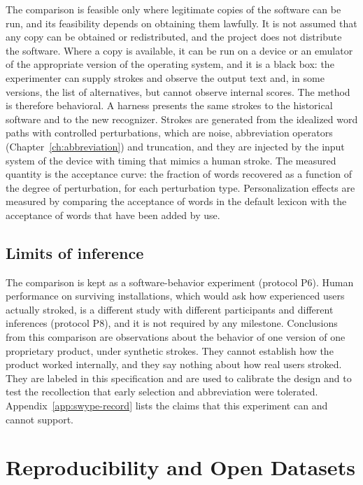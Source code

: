 The comparison is feasible only where legitimate copies of the software can be run, and its feasibility depends on obtaining them lawfully. It is not assumed that any copy can be obtained or redistributed, and the project does not distribute the software. Where a copy is available, it can be run on a device or an emulator of the appropriate version of the operating system, and it is a black box: the experimenter can supply strokes and observe the output text and, in some versions, the list of alternatives, but cannot observe internal scores. The method is therefore behavioral. A harness presents the same strokes to the historical software and to the new recognizer. Strokes are generated from the idealized word paths with controlled perturbations, which are noise, abbreviation operators (Chapter~\ref{ch:abbreviation}) and truncation, and they are injected by the input system of the device with timing that mimics a human stroke. The measured quantity is the acceptance curve: the fraction of words recovered as a function of the degree of perturbation, for each perturbation type. Personalization effects are measured by comparing the acceptance of words in the default lexicon with the acceptance of words that have been added by use.

\section{Limits of inference}

The comparison is kept as a software-behavior experiment (protocol P6). Human performance on surviving installations, which would ask how experienced users actually stroked, is a different study with different participants and different inferences (protocol P8), and it is not required by any milestone. Conclusions from this comparison are observations about the behavior of one version of one proprietary product, under synthetic strokes. They cannot establish how the product worked internally, and they say nothing about how real users stroked. They are labeled \evO{} in this specification and are used to calibrate the design and to test the recollection that early selection and abbreviation were tolerated. Appendix~\ref{app:swype-record} lists the claims that this experiment can and cannot support.

\chapter{Reproducibility and Open Datasets}\label{ch:open-data}

